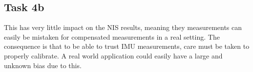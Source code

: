 \subsection{Task 4b}

This has very little impact on the NIS results, meaning they measurements can easily be mistaken
for compensated measurements in a real setting. The consequence is that to be able to trust IMU
measurements, care must be taken to properly calibrate. A real world application could easily have 
a large and unknown bias due to this.
